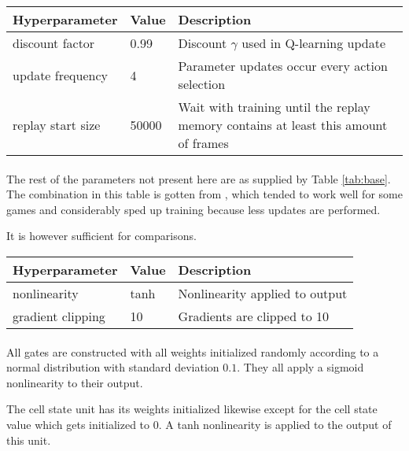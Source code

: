 \begin{table}
  \label{tab:boost}
  \renewcommand{\arraystretch}{1.3}
\begin{tabularx}{1.\linewidth}{ll X}
Hyperparameter                  & Value             & Description                                                                                              \\
  \hline
discount factor                 & 0.99              & Discount $\gamma$ used in Q-learning update                                                              \\
update frequency                & 4                 & Parameter updates occur every action selection                                                           \\
replay start size               & 50000               & Wait with training until the replay memory contains at least this amount of frames                       \\

\end{tabularx}

\paragraph{}
\small
The rest of the parameters not present here are as supplied by Table \ref{tab:base}.
The combination in this table is gotten from \cite{Mnih2015},
which tended to work well for some games and considerably sped up training
because less updates are performed.

It is however sufficient for comparisons.
\end{table}

\begin{table}
  \label{tab:lstm_params}
  \renewcommand{\arraystretch}{1.3}
\begin{tabularx}{1.\linewidth}{ll X}
Hyperparameter                  & Value             & Description                                                                                              \\
  \hline
nonlinearity & tanh & Nonlinearity applied to output \\
gradient clipping & 10 & Gradients are clipped to 10 \\
\end{tabularx}

\paragraph{}
All gates are constructed with all weights initialized randomly
according to a normal distribution with standard deviation $0.1$.
They all apply a sigmoid nonlinearity to their output.

The cell state unit has its weights initialized likewise
except for the cell state value which gets initialized to 0.
A tanh nonlinearity is applied to the output of this unit.
\end{table}

